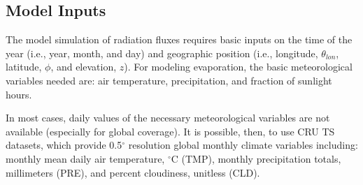 \subsection{Model Inputs}
\label{sec:inputs}
The model simulation of radiation fluxes requires basic inputs on the time of the year (i.e., year, month, and day) and geographic position (i.e., longitude, $\theta_{lon}$, latitude, $\phi$, and elevation, $z$). 
For modeling evaporation, the basic meteorological variables needed are: air temperature, precipitation, and fraction of sunlight hours. 

In most cases, daily values of the necessary meteorological variables are not available (especially for global coverage). 
It is possible, then, to use CRU TS datasets\footnotemark, which provide 0.5$^{\circ}$ resolution global monthly climate variables including: monthly mean daily air temperature, $^{\circ}$C (TMP), monthly precipitation totals, millimeters (PRE), and percent cloudiness, unitless (CLD). 

